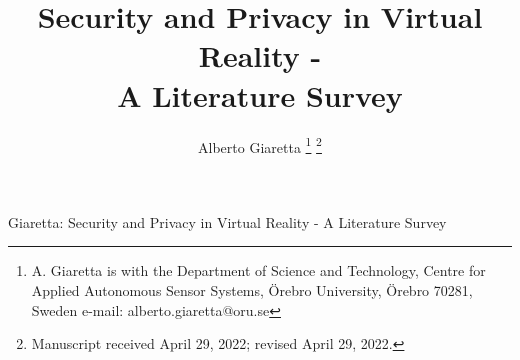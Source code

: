 \documentclass[journal]{IEEEtran}
\begin{document}
%
\title{Security and Privacy in Virtual Reality -\\A Literature Survey}
%
%
%

\author{Alberto Giaretta%
\thanks{A. Giaretta is with the Department of Science and Technology, Centre for Applied Autonomous Sensor Systems, \"Orebro University, \"Orebro 70281, Sweden e-mail: alberto.giaretta@oru.se}%
\thanks{Manuscript received April 29, 2022; revised April 29, 2022.}}

% 
%



%
{Giaretta: Security and Privacy in Virtual Reality - A Literature Survey}
% 
\end{document}
